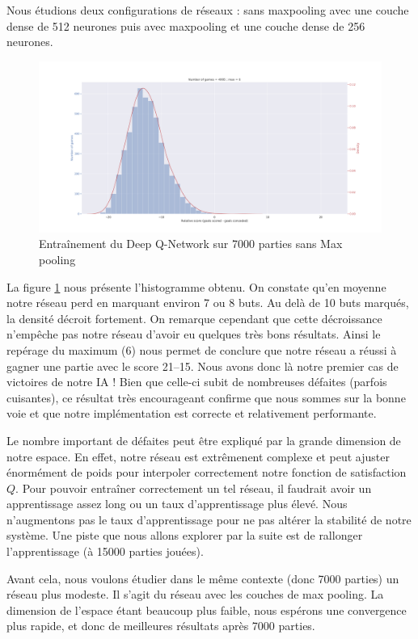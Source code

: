 Nous étudions deux configurations de réseaux : sans maxpooling avec une couche dense de 512 neurones puis avec maxpooling et une couche dense de 256 neurones.

\begin{figure}[h]
 \centering
 \includegraphics[width = \textwidth]{img/DQL_7000_withoutMax.png}
 \caption{Entraînement du Deep Q-Network sur 7000 parties sans Max pooling}
 \label{fig:DQL_7000_withoutMax}
\end{figure}

La figure \ref{fig:DQL_7000_withoutMax} nous présente l'histogramme obtenu. On constate qu'en moyenne notre réseau perd en marquant environ 7 ou 8 buts. Au delà de 
10 buts marqués, la densité décroit fortement. On remarque cependant que cette décroissance n'empêche pas notre réseau d'avoir eu quelques très bons résultats.
Ainsi le repérage du maximum (6) nous permet de conclure que notre réseau a réussi à gagner une partie avec le score 21--15. Nous avons donc là notre premier cas 
de victoires de notre IA ! Bien que celle-ci subit de nombreuses défaites (parfois cuisantes), ce résultat très encourageant confirme que nous sommes sur la bonne voie 
et que notre implémentation est correcte et relativement performante.

Le nombre important de défaites peut être expliqué par la grande dimension de notre espace. En effet, notre réseau est extrêmenent complexe et peut ajuster énormément 
de poids pour interpoler correctement notre fonction de satisfaction $Q$. Pour pouvoir entraîner correctement un tel réseau, il faudrait avoir un apprentissage assez 
long ou un taux d'apprentissage plus élevé. Nous n'augmentons pas le taux d'apprentissage pour ne pas altérer la stabilité de notre système. Une piste que nous
allons explorer par la suite est de rallonger l'apprentissage (à 15000 parties jouées). 

Avant cela, nous voulons étudier dans le même contexte (donc 7000 parties) un réseau plus modeste. Il s'agit du réseau avec les couches de max pooling. La dimension
de l'espace étant beaucoup plus faible, nous espérons une convergence plus rapide, et donc de meilleures résultats après 7000 parties.

